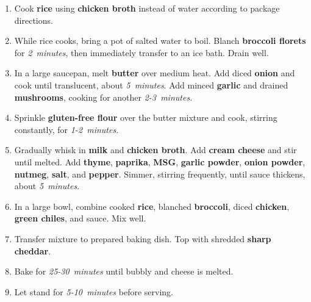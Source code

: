 \documentclass[11pt,letterpaper]{article}
\begin{document}
\begin{enumerate}
    \item Cook \textbf{rice} using \textbf{chicken broth} instead of water according to package directions.
    
    \item While rice cooks, bring a pot of salted water to boil. Blanch \textbf{broccoli florets} for \textit{2~minutes}, then immediately transfer to an ice bath. Drain well.
    
    \item In a large saucepan, melt \textbf{butter} over medium heat. Add diced \textbf{onion} and cook until translucent, about \textit{5~minutes}. Add minced \textbf{garlic} and drained \textbf{mushrooms}, cooking for another \textit{2-3~minutes}.
    
    \item Sprinkle \textbf{gluten-free flour} over the butter mixture and cook, stirring constantly, for \textit{1-2~minutes}.
    
    \item Gradually whisk in \textbf{milk} and \textbf{chicken broth}. Add \textbf{cream cheese} and stir until melted. Add \textbf{thyme}, \textbf{paprika}, \textbf{MSG}, \textbf{garlic powder}, \textbf{onion powder}, \textbf{nutmeg}, \textbf{salt}, and \textbf{pepper}. Simmer, stirring frequently, until sauce thickens, about \textit{5~minutes}.
    
    \item In a large bowl, combine cooked \textbf{rice}, blanched \textbf{broccoli}, diced \textbf{chicken}, \textbf{green chiles}, and sauce. Mix well.
    
    \item Transfer mixture to prepared baking dish. Top with shredded \textbf{sharp cheddar}.
    
    \item Bake for \textit{25-30~minutes} until bubbly and cheese is melted.
    
    \item Let stand for \textit{5-10~minutes} before serving.
\end{enumerate}

\newpage
\end{document}
